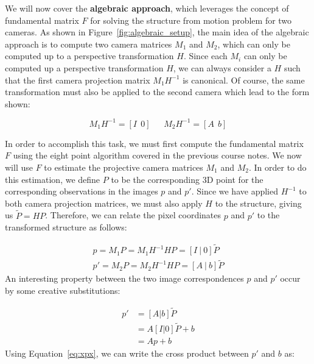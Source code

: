 \documentclass[a4paper, 12pt]{article}
\renewcommand\emph{\textbf}
\numberwithin{equation}{section}
\begin{document}
We will now cover the \emph{algebraic approach}, which leverages the concept of fundamental matrix $F$ for solving the structure from motion problem for two cameras. As shown in Figure~\ref{fig:algebraic_setup}, the main idea of the algebraic approach is to compute two camera matrices $M_1$ and $M_2$, which can only be computed up to a perspective transformation $H$. Since each $M_i$ can only be computed up a perspective transformation $H$, we can always consider a $H$ such that the first camera projection matrix $M_1 H^{-1}$ is canonical. Of course, the same transformation must also be applied to the second camera which lead to the form shown:

\begin{equation}
    M_1 H^{-1} = [I ~~ 0] ~~~~~~~ M_2 H^{-1} = [A ~~ b]
    \label{eq:mh}
\end{equation}

In order to accomplish this task, we must first compute the fundamental matrix $F$ using the eight point algorithm covered in the previous course notes. We now will use $F$ to estimate the projective camera matrices $M_1$ and $M_2$. In order to do this estimation, we define $P$ to be the corresponding 3D point for the corresponding observations in the images $p$ and $p'$. Since we have applied $H^{-1}$ to both camera projection matrices, we must also apply $H$ to the structure, giving us $\widetilde{P} = HP$. Therefore, we can relate the pixel coordinates $p$ and $p'$ to the transformed structure as follows:

\begin{equation}
    \begin{split}
        p = M_1 P = M_1 H^{-1} H P = [I ~ | ~ 0] \widetilde{P}\\
        p' = M_2 P = M_2 H^{-1} H P = [A ~ | ~ b] \widetilde{P}
    \end{split}
    \label{eq:x}
\end{equation}
An interesting property between the two image correspondences $p$ and $p'$ occur by some creative substitutions:

\begin{equation}
    \begin{split}
        p'&= [A|b] \widetilde{P}\\
        &= A[I|0] \widetilde{P} +b \\
        &= Ap+b
    \end{split}
    \label{eq:xpx}
\end{equation}
Using Equation~\ref{eq:xpx}, we can write the cross product between $p'$ and $b$ as:
\end{document}
